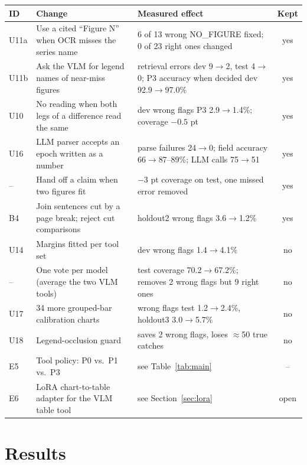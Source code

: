 \documentclass[11pt,a4paper]{article}
\begin{document}
\begin{center}\small
\begin{tabularx}{\linewidth}{lXXc}
\toprule
ID & Change & Measured effect & Kept \\
\midrule
U11a & Use a cited ``Figure N'' when OCR misses the series name & 6 of 13 wrong NO\_FIGURE fixed; 0 of 23 right ones changed & yes \\
U11b & Ask the VLM for legend names of near-miss figures & retrieval errors dev 9$\to$2, test 4$\to$0; P3 accuracy when decided dev 92.9$\to$97.0\% & yes \\
U10 & No reading when both legs of a difference read the same & dev wrong flags P3 2.9$\to$1.4\%; coverage $-0.5$ pt & yes \\
U16 & LLM parser accepts an epoch written as a number & parse failures 24$\to$0; field accuracy 66$\to$87--89\%; LLM calls 75$\to$51 & yes \\
-- & Hand off a claim when two figures fit & $-3$ pt coverage on test, one missed error removed & yes \\
B4 & Join sentences cut by a page break; reject cut comparisons & holdout2 wrong flags 3.6$\to$1.2\% & yes \\
U14 & Margins fitted per tool set & dev wrong flags 1.4$\to$4.1\% & no \\
-- & One vote per model (average the two VLM tools) & test coverage 70.2$\to$67.2\%; removes 2 wrong flags but 9 right ones & no \\
U17 & 34 more grouped-bar calibration charts & wrong flags test 1.2$\to$2.4\%, holdout3 3.0$\to$5.7\% & no \\
U18 & Legend-occlusion guard & saves 2 wrong flags, loses $\approx$50 true catches & no \\
E5 & Tool policy: P0 vs.\ P1 vs.\ P3 & see Table~\ref{tab:main} & -- \\
E6 & LoRA chart-to-table adapter for the VLM table tool & see Section~\ref{sec:lora} & open \\
\bottomrule
\end{tabularx}
\end{center}

\section{Results}
\end{document}
